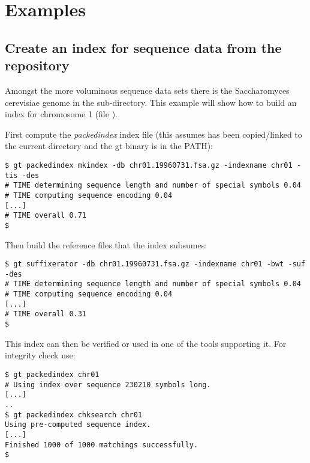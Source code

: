 \documentclass[12pt,titlepage]{article}
\newcommand{\packedindex}{\textit{packedindex}\xspace}
\newcommand{\species}[1]{{\fontshape{it}\selectfont #1}}%
\begin{document}
\section{Examples}
\label{sec:packedindex:examples}

\subsection{Create an index for sequence data from the
   repository\cite{gttestdata}}
\label{sec:packedindex:examples:yeast}

Amongst the more voluminous sequence data sets there is the
\species{Saccharomyces cerevisiae} genome in the
 sub-directory. This example will show how
to build an index for chromosome 1 (file
).

First compute the \packedindex index file (this assumes
 has been copied/linked to the current
directory and the gt binary is in the PATH):
\begin{footnotesize}
\begin{verbatim}
$ gt packedindex mkindex -db chr01.19960731.fsa.gz -indexname chr01 -tis -des
# TIME determining sequence length and number of special symbols 0.04
# TIME computing sequence encoding 0.04
[...]
# TIME overall 0.71
$
\end{verbatim}
\end{footnotesize}

Then build the reference files that the index subsumes:
\begin{footnotesize}
\begin{verbatim}
$ gt suffixerator -db chr01.19960731.fsa.gz -indexname chr01 -bwt -suf -des
# TIME determining sequence length and number of special symbols 0.04
# TIME computing sequence encoding 0.04
[...]
# TIME overall 0.31
$
\end{verbatim}
\end{footnotesize}

This index can then be verified or used in one of the tools supporting
it. For integrity check use:
\begin{footnotesize}
\begin{verbatim}
$ gt packedindex chr01
# Using index over sequence 230210 symbols long.
[...]
..
$ gt packedindex chksearch chr01
Using pre-computed sequence index.
[...]
Finished 1000 of 1000 matchings successfully.
$
\end{verbatim}
\end{footnotesize}



\end{document}
